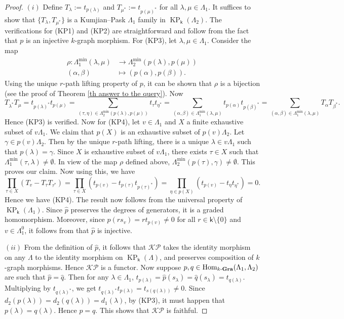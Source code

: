 \documentclass[a4paper,reqno,11pt]{amsart}
\numberwithin{equation}{section}
\theoremstyle{definition}
\theoremstyle{remark}
\newcommand{\Hom}{\operatorname{Hom}}
\newcommand{\KP}{\operatorname{KP}}
\begin{document}
\begin{proof}
$(i)$ Define $T_\lambda:=t_{p(\lambda)}$ and $T_{\mu^*}:=t_{p(\mu)^*}$ for all $\lambda,\mu\in \Lambda_1$. It suffices to show that $\{T_\lambda,T_{\mu^*}\}$ is a Kumjian--Pask $\Lambda_1$ family in $\KP_\mathsf{k}(\Lambda_2)$. The verifications for (KP1) and (KP2) are straightforward and follow from the fact that $p$ is an injective $k$-graph morphism. For (KP3), let $\lambda,\mu\in \Lambda_1$. Consider the map 
\begin{align*}
\rho:\Lambda_1^{\min}(\lambda,\mu)&\longrightarrow \Lambda_2^{\min}(p(\lambda),p(\mu))\\
(\alpha,\beta)&\longmapsto (p(\alpha),p(\beta)).
\end{align*}
Using the unique $r$-path lifting property of $p$, it can be shown that $\rho$ is a bijection (see the proof of Theorem \ref{th answer to the query}). Now \[T_{\lambda^*}T_\mu=t_{p(\lambda)^*}t_{p(\mu)}=\displaystyle{\sum_{(\tau,\eta)\in \Lambda_2^{\min}(p(\lambda),p(\mu))}}t_\tau t_{\eta^*}=\displaystyle{\sum_{(\alpha,\beta)\in \Lambda_1^{\min}(\lambda,\mu)}}t_{p(\alpha)}t_{p(\beta)^*}=\displaystyle{\sum_{(\alpha,\beta)\in \Lambda_1^{\min}(\lambda,\mu)}}T_\alpha T_{\beta^*}.\] Hence (KP3) is verified. Now for (KP4), let $v\in \Lambda_1$ and $X$ a finite exhaustive subset of $v\Lambda_1$. We claim that $p(X)$ is an exhaustive subset of $p(v)\Lambda_2$. Let $\gamma\in p(v)\Lambda_2$. Then by the unique $r$-path lifting, there is a unique $\lambda\in v\Lambda_1$ such that $p(\lambda)=\gamma$. Since $X$ is exhaustive subset of $v\Lambda_1$, there exists $\tau\in X$ such that $\Lambda_1^{\min}(\tau,\lambda)\neq \emptyset$. In view of the map $\rho$ defined above, $\Lambda_2^{\min}(p(\tau),\gamma)\neq \emptyset$. This proves our claim. Now using this, we have \[\displaystyle{\prod_{\tau\in X}}\left(T_v-T_\tau T_{\tau^*}\right)=\displaystyle{\prod_{\tau\in X}}\left(t_{p(v)}-t_{p(\tau)}t_{p(\tau)^*}\right)=\displaystyle{\prod_{\eta\in p(X)}}\left(t_{p(v)}-t_\eta t_{\eta^*}\right)=0.\] Hence we have (KP4). The result now follows from the universal property of $\KP_\mathsf{k}(\Lambda_1)$. Since $\widehat{p}$ preserves the degrees of generators, it is a graded homomorphism. Moreover, since $\widehat{p}(r s_v)=rt_{p(v)}\neq 0$ for all $r\in \mathsf{k}\setminus \{0\}$ and $v\in \Lambda_1^0$, it follows from \cite[Theorem 3.7(b) \& Theorem 4.1]{Clark} that $\widehat{p}$ is injective.

$(ii)$ From the definition of $\widehat{p}$, it follows that $\mathcal{K}\mathcal{P}$ takes the identity morphism on any $\Lambda$ to the identity morphism on $\KP_\mathsf{k}(\Lambda)$, and preserves composition of $k$-graph morphisms. Hence $\mathcal{K}\mathcal{P}$ is a functor. Now suppose $p,q\in \Hom_{k\textup{-\textbf{Gra}}}(\Lambda_1,\Lambda_2)$ are such that $\widehat{p}=\widehat{q}$. Then for any $\lambda\in \Lambda_1$, $t_{p(\lambda)}=\widehat{p}(s_\lambda)=\widehat{q}(s_\lambda)=t_{q(\lambda)}$. Multiplying by $t_{q(\lambda)^*}$, we get $t_{q(\lambda)^*}t_{p(\lambda)}=t_{s(q(\lambda))}\neq 0$. Since $d_2(p(\lambda))=d_2(q(\lambda))=d_1(\lambda)$, by (KP3), it must happen that $p(\lambda)=q(\lambda)$. Hence $p=q$. This shows that $\mathcal{K}\mathcal{P}$ is faithful.  
\end{proof}
\end{document}
